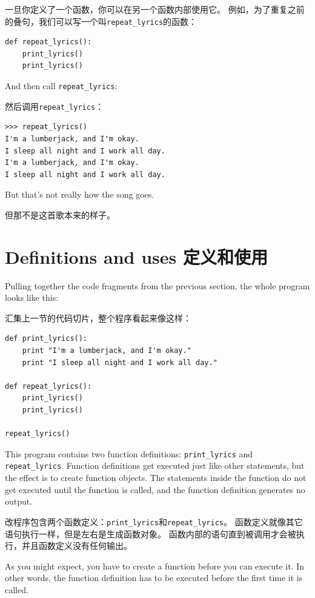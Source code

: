 \documentclass[10pt]{book}
\begin{document}
\begin{CJK}{UTF8}{gbsn}
一旦你定义了一个函数，你可以在另一个函数内部使用它。
例如，为了重复之前的叠句，我们可以写一个叫\verb"repeat_lyrics"的函数：

\begin{verbatim}
def repeat_lyrics():
    print_lyrics()
    print_lyrics()
\end{verbatim}
%
And then call \verb"repeat_lyrics":

然后调用\verb"repeat_lyrics"：

\begin{verbatim}
>>> repeat_lyrics()
I'm a lumberjack, and I'm okay.
I sleep all night and I work all day.
I'm a lumberjack, and I'm okay.
I sleep all night and I work all day.
\end{verbatim}
%
But that's not really how the song goes.

但那不是这首歌本来的样子。

\section{Definitions and uses 定义和使用}

Pulling together the code fragments from the previous section, the
whole program looks like this:

汇集上一节的代码切片，整个程序看起来像这样：

\begin{verbatim}
def print_lyrics():
    print "I'm a lumberjack, and I'm okay."
    print "I sleep all night and I work all day."

def repeat_lyrics():
    print_lyrics()
    print_lyrics()

repeat_lyrics()
\end{verbatim}
%
This program contains two function definitions: \verb"print_lyrics" and
\verb"repeat_lyrics".  Function definitions get executed just like other
statements, but the effect is to create function objects.  The statements
inside the function do not get executed until the function is called, and
the function definition generates no output.

改程序包含两个函数定义：\verb"print_lyrics"和\verb"repeat_lyrics"。
函数定义就像其它语句执行一样，但是左右是生成函数对象。
函数内部的语句直到被调用才会被执行，并且函数定义没有任何输出。

As you might expect, you have to create a function before you can
execute it.  In other words, the function definition has to be
executed before the first time it is called.


\end{CJK}
\end{document}
